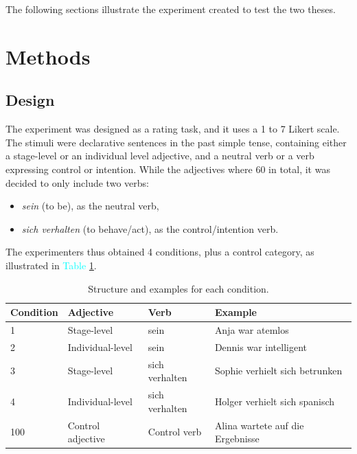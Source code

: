 \documentclass[12pt,a4paper]{article}
\begin{document}
The following sections illustrate the experiment created to test the two theses. 


\section{Methods}

\subsection{Design}

The experiment was designed as a rating task, and it uses a 1 to 7 Likert scale. The stimuli were declarative sentences in the past simple tense, containing either a stage-level or an individual level adjective, and a neutral verb or a verb expressing control or intention. While the adjectives where 60 in total, it was decided to only include two verbs:

\begin{itemize}
\item \textit{\gls{sein}} (to be), as the neutral verb,
\item \textit{\gls{sich verhalten}} (to behave/act), as the control/intention verb.
\end{itemize}

The experimenters thus obtained 4 conditions, plus a control category, as illustrated in \textcolor{cyan}{Table \ref{Table 1}}.\\


\begin{table}[h]
\captionsetup{font=scriptsize}
\begin{tabular}{||l|l|l|l||}
\hline
\textbf{Condition} & \textbf{Adjective} & \textbf{Verb} & \textbf{Example}\\
\hline \hline
1 & Stage-level & \gls{sein} & \gls{Anja war atemlos}\\
\hline
2 & Individual-level & \gls{sein} & \gls{Dennis war intelligent} \\
\hline
3 & Stage-level & \gls{sich verhalten} & \gls{Sophie verhielt sich betrunken} \\
\hline
4 & Individual-level & \gls{sich verhalten} & \gls{Holger verhielt sich spanisch}\\
\hline
100 & Control adjective & Control verb & \gls{Alina wartete auf die Ergebnisse} \\
\hline
\end{tabular}
\caption{Structure and examples for each condition.}
\label{Table 1}
\end{table}
\end{document}
